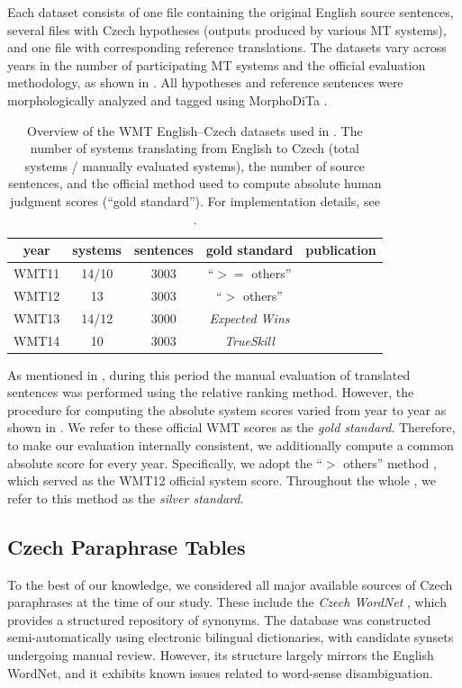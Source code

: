 Each dataset consists of one file containing the original English source sentences, several files with Czech hypotheses (outputs produced by various MT systems), and one file with corresponding reference translations. The datasets vary across years in the number of participating MT systems and the official evaluation methodology, as shown in . All hypotheses and reference sentences were morphologically analyzed and tagged using MorphoDiTa \citep{morphodita}. 

\begin{table}[tb]
\centering
\begin{tabular}{ccccl}
\toprule
year  & systems & sentences & gold standard & publication\\
\midrule
WMT11 & 14/10   & 3003      & “$ >= $ others”      & \cite{wmt11}  \\
WMT12 & 13      & 3003      & “$ > $ others”      & \cite{wmt12}  \\
WMT13 & 14/12   & 3000      & \textit{Expected Wins} & \cite{wmt13}  \\
WMT14 & 10      & 3003      & \textit{TrueSkill}   & \cite{wmt14} \\
\bottomrule
\end{tabular}
\caption{Overview of the WMT English–Czech datasets used in . The number of systems translating from English to Czech (total systems / manually evaluated systems), the number of source sentences, and the official method used to compute absolute human judgment scores (“gold standard”). For implementation details, see .}
\label{wmt-data}
\end{table}

As mentioned in , during this period the manual evaluation of translated sentences was performed using the relative ranking method. However, the procedure for computing the absolute system scores varied from year to year as shown in . We refer to these official WMT scores as the \emph{gold standard}. Therefore, to make our evaluation internally consistent, we additionally compute a common absolute score for every year. Specifically, we adopt the “$ >$ others” method \citep{bojar-grains}, which served as the WMT12 official system score. Throughout the whole , we refer to this method as the \emph{silver standard}.

\subsection{Czech Paraphrase Tables}
\label{sect:paraphrase-tables}
To the best of our knowledge, we considered all major available sources of Czech paraphrases at the time of our study. These include the \textit{Czech WordNet} \citep{czech-wordnet}, which provides a structured repository of synonyms. The database was constructed semi-automatically using electronic bilingual dictionaries, with candidate synsets undergoing manual review. However, its structure largely mirrors the English WordNet, and it exhibits known issues related to word-sense disambiguation.

